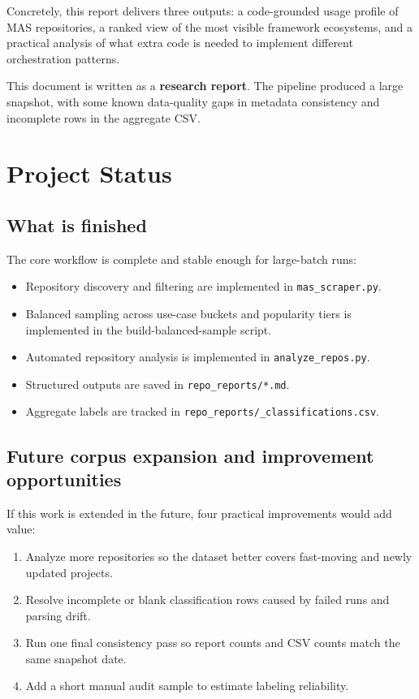 \documentclass[12pt,a4paper,onecolumn]{article}
\begin{document}
Concretely, this report delivers three outputs: a code-grounded usage profile of MAS repositories, a ranked view of the most visible framework ecosystems, and a practical analysis of what extra code is needed to implement different orchestration patterns.

This document is written as a \textbf{research report}. The pipeline produced a large snapshot, with some known data-quality gaps in metadata consistency and incomplete rows in the aggregate CSV.

\section{Project Status}
\subsection{What is finished}
The core workflow is complete and stable enough for large-batch runs:
\begin{itemize}
  \item Repository discovery and filtering are implemented in \texttt{mas\_scraper.py}.
  \item Balanced sampling across use-case buckets and popularity tiers is implemented in the build-balanced-sample script.
  \item Automated repository analysis is implemented in \texttt{analyze\_repos.py}.
  \item Structured outputs are saved in \texttt{repo\_reports/*.md}.
  \item Aggregate labels are tracked in \texttt{repo\_reports/\_classifications.csv}.
\end{itemize}

\subsection{Future corpus expansion and improvement opportunities}
If this work is extended in the future, four practical improvements would add value:
\begin{enumerate}
  \item Analyze more repositories so the dataset better covers fast-moving and newly updated projects.
  \item Resolve incomplete or blank classification rows caused by failed runs and parsing drift.
  \item Run one final consistency pass so report counts and CSV counts match the same snapshot date.
  \item Add a short manual audit sample to estimate labeling reliability.
\end{enumerate}
\end{document}
